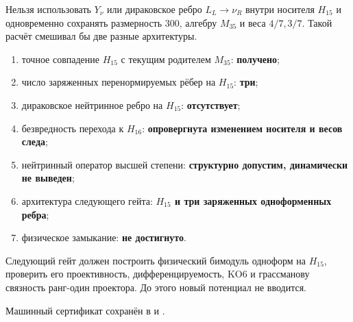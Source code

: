 \begin{nogocriterion}
Нельзя использовать $Y_\nu$ или дираковское ребро $L_L\to\nu_R$ внутри
носителя $H_{15}$ и одновременно сохранять размерность $300$, алгебру
$M_{35}$ и веса $4/7,3/7$. Такой расчёт смешивал бы две разные
архитектуры.
\end{nogocriterion}

\begin{protocol}
\begin{enumerate}
 \item точное совпадение $H_{15}$ с текущим родителем $M_{35}$:
 \textbf{получено};
 \item число заряженных перенормируемых рёбер на $H_{15}$:
 \textbf{три};
 \item дираковское нейтринное ребро на $H_{15}$:
 \textbf{отсутствует};
 \item безвредность перехода к $H_{16}$:
 \textbf{опровергнута изменением носителя и весов следа};
 \item нейтринный оператор высшей степени:
 \textbf{структурно допустим, динамически не выведен};
 \item архитектура следующего гейта:
 \textbf{$H_{15}$ и три заряженных одноформенных ребра};
 \item физическое замыкание:
 \textbf{не достигнуто}.
\end{enumerate}
\end{protocol}

Следующий гейт должен построить физический бимодуль одноформ на $H_{15}$,
проверить его проективность, дифференцируемость, KO6 и грассманову
связность ранг-один проектора. До этого новый потенциал не вводится.

Машинный сертификат сохранён в
 и
.